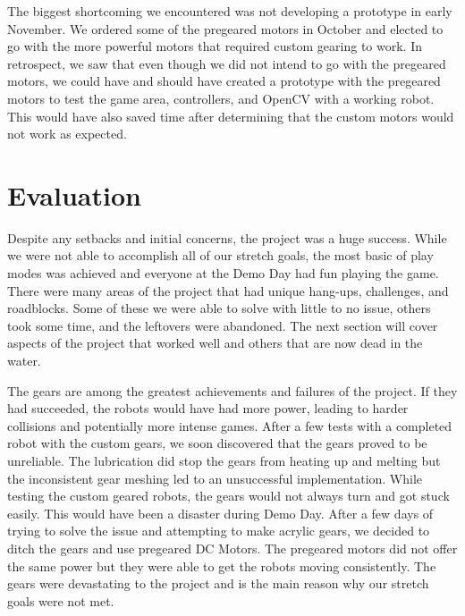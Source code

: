 \documentclass[11pt]{ieeeconf}
\begin{document}
The biggest shortcoming we encountered was not developing a prototype in early November. We ordered some of the pregeared motors in October and elected to go with the more powerful motors that required custom gearing to work. In retrospect, we saw that even though we did not intend to go with the pregeared motors, we could have and should have created a prototype with the pregeared motors to test the game area, controllers, and OpenCV with a working robot. This would have also saved time after determining that the custom motors would not work as expected. 

\section{Evaluation}

Despite any setbacks and initial concerns, the project was a huge success. While we were not able to accomplish all of our stretch goals, the most basic of play modes was achieved and everyone at the Demo Day had fun playing the game. There were many areas of the project that had unique hang-ups, challenges, and roadblocks. Some of these we were able to solve with little to no issue, others took some time, and the leftovers were abandoned. The next section will cover aspects of the project that worked well and others that are now dead in the water.

The gears are among the greatest achievements and failures of the project. If they had succeeded, the robots would have had more power, leading to harder collisions and potentially more intense games. After a few tests with a completed robot with the custom gears, we soon discovered that the gears proved to be unreliable. The lubrication did stop the gears from heating up and melting but the inconsistent gear meshing led to an unsuccessful implementation. While testing the custom geared robots, the gears would not always turn and got stuck easily. This would have been a disaster during Demo Day. After a few days of trying to solve the issue and attempting to make acrylic gears, we decided to ditch the gears and use pregeared DC Motors. The pregeared motors did not offer the same power but they were able to get the robots moving consistently. The gears were devastating to the project and is the main reason why our stretch goals were not met.
\end{document}
